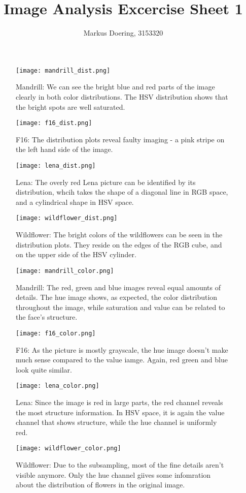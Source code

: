 \documentclass[11pt]{scrartcl}
\begin{document}
\title{Image Analysis Excercise Sheet 1}
\author{Markus Doering, 3153320}
\maketitle

\begin{figure}[hb]
\texttt{[image: mandrill\_dist.png]} 
\caption{Mandrill: We can see the bright blue and red parts of the image clearly in both color distributions. The HSV distribution shows that the bright spots are well saturated.}
\end{figure}
\begin{figure}[ht]
\texttt{[image: f16\_dist.png]}
\caption{F16: The distribution plots reveal faulty imaging - a pink stripe on the left hand side of the image.}
\end{figure}
\begin{figure}[ht]
\texttt{[image: lena\_dist.png]}
\caption{Lena: The overly red Lena picture can be identified by its distribution, whcih takes the shape of a diagonal line in RGB space, and a cylindrical shape in HSV space.}
\end{figure}
\begin{figure}[ht]
\texttt{[image: wildflower\_dist.png]}
\caption{Wildflower: The bright colors of the wildflowers can be seen in the distribution plots. They reside on the edges of the RGB cube, and on the upper side of the HSV cylinder. }
\end{figure}


\begin{figure}[ht]
\texttt{[image: mandrill\_color.png]} 
\caption{Mandrill: The red, green and blue images reveal equal amounts of details. The hue image shows, as expected, the color distribution throughout the image, while saturation and value can be related to the face's structure.}
\end{figure}
\begin{figure}[ht]
\texttt{[image: f16\_color.png]}
\caption{F16: As the picture is mostly grayscale, the hue image doesn't make much sense compared to the value iamge. Again, red green and blue look quite similar.}
\end{figure}
\begin{figure}[ht]
\texttt{[image: lena\_color.png]}
\caption{Lena: Since the image is red in large parts, the red channel reveals the most structure information. In HSV space, it is again the value channel that shows structure, while the hue channel is uniformly red.}
\end{figure}
\begin{figure}[ht]
\texttt{[image: wildflower\_color.png]}
\caption{Wildflower: Due to the subsampling, most of the fine details aren't visible anymore. Only the hue channel giives some infomration about the distribution of flowers in the original image.}
\end{figure}
\end{document}
